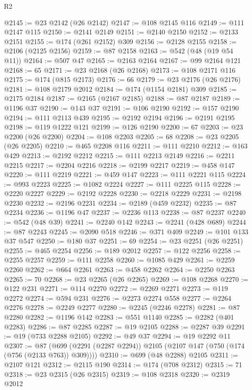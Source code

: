 \begin{lexlean}{R2}
\begin{coremodule}
{{{{{{{{{{{{{{{{{{{{{{{{{{{{{{{{{{{{{{{{{{{{{{{{{{{{{{{{{{{{{{{{{{{{{{{{{{{{{{{{{{{{{{{{{{{{{{{{{{{{{{{{{{{{{{{{{{{{{{{{{{{{{{{{{{{{{{{{{{{{@2145 := @23 @2142 (@26 @2142)
@2147 := @108 @2145 @116
@2149 := @111 @2147 @115
@2150 := @2141 @2149
@2151 := @2140 @2150
@2152 := @2133 @2151
@2155 := @174 (@261 @2152) @309
@2156 := @2128 @2155
@2158 := @2106 (@2125 @2156)
@2159 := @87 @2158
@2163 := @542 (@48 (@19 @54 @11))
@2164 := @507 @47
@2165 := @2163 @2164
@2167 := @99 @2164 @121
@2168 := 65
@2171 := @23 @2168 (@26 @2168)
@2173 := @108 @2171 @116
@2175 := @174 (@815 @2173)
@2176 := 66
@2179 := @23 @2176 (@26 @2176)
@2181 := @108 @2179 @2012
@2184 := @174 (@1154 @2181) @309
@2185 := @2175 @2184
@2187 := @2165 (@2167 @2185)
@2188 := @87 @2187
@2189 := @1196 @37
@2190 := @143 @37
@2191 := @106 @2190
@2192 := @157 @2190
@2194 := @111 @2113 @439
@2195 := @2192 @2194
@2196 := @2191 @2195
@2198 := @119 @1222 @121
@2199 := @126 @2190
@2200 := 67
@2203 := @23 @2200 (@26 @2200)
@2204 := @108 @2203
@2205 := 68
@2208 := @23 @2205 (@26 @2205)
@2210 := @465 @2208 @116
@2211 := @111 @2210
@2212 := @163 @429
@2213 := @2192 @2212
@2215 := @111 @2213 @2149
@2216 := @2211 @2215
@2217 := @2204 @2216
@2218 := @2199 @2217
@2219 := @458 @147
@2220 := @111 @2219
@2221 := @459 @147
@2223 := @111 @2221 @115
@2224 := @993 @2223
@2225 := @1082 @2224
@2227 := @111 @2225 @115
@2228 := @2220 @2227
@2229 := @2192 @2228
@2230 := @2218 @2229
@2231 := @2198 @2230
@2232 := @2196 @2231
@2234 := @2189 (@459 @2232)
@2235 := @87 @2234
@2236 := @1196 @47
@2237 := @2236 @113
@2238 := @87 @2237
@2240 := @542 (@48 @39)
@2241 := @2240 @142
@2243 := @2241 (@428 @689)
@2244 := @87 @2243
@2245 := @2090 @518
@2246 := @371 @409
@2249 := @101 @133 @37 @547
@2250 := @180 @37
@2251 := 69
@2254 := @23 @2251 (@26 @2251)
@2255 := @465 @2254
@2256 := @189 @2012
@2257 := @122 @2256
@2258 := @2255 @2257
@2259 := @111 @2258
@2260 := @1085 @429
@2261 := @2259 @2260
@2262 := @664 @2261
@2263 := @458 @2262
@2264 := @2250 @2263
@2265 := 70
@2268 := @23 @2265 (@26 @2265)
@2269 := @108 @2268
@2270 := @122 @231
@2271 := @114 @2270
@2272 := @2269 @2271
@2273 := @119 @2272
@2274 := @594 @231
@2276 := @2273 @2274 @558
@2277 := @2264 @2276
@2278 := @2249 @2277
@2280 := @2245 (@2246 @2278)
@2281 := @87 @2280
@2282 := @1196 @142
@2283 := @551 @1140
@2285 := @2282 (@401 @2283)
@2286 := @87 @2285
@2287 := @19 @2105
@2288 := @2287 @39
@2291 := @19 (@733 @2288 @2105)
@2292 := @49 @37
@2294 := @19 @2292 @11
@2307 := @87 (@699 (@2291 (@2287 @2294)) @2105 (@2107 @147 (@750 (@174 (@756 (@2133 @763)) @309))))
@2310 := @699 (@48 @2288) @2105
@2311 := @2107 @121
@2312 := @2115 @190
@2314 := @174 (@708 @2312)
@2315 := 71
@2318 := @23 @2315 (@26 @2315)
@2319 := @108 @2318
@2320 := @2319 @2012
}}}}}}}}}}}}}}}}}}}}}}}}}}}}}}}}}}}}}}}}}}}}}}}}}}}}}}}}}}}}}}}}}}}}}}}}}}}}}}}}}}}}}}}}}}}}}}}}}}}}}}}}}}}}}}}}}}}}}}}}}}}}}}}}}}}}}}}}}}}}
\end{coremodule}
\end{lexlean}
